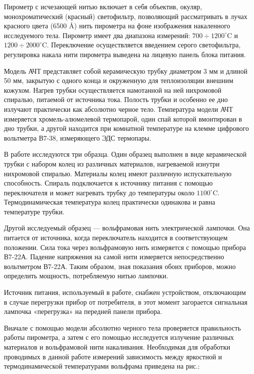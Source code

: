 \documentclass[a4paper,12pt]{article}
\begin{document}
Пирометр с исчезающей нитью включает в себя объектив, окуляр, монохроматический (красный) светофильтр, позволяющий рассматривать в лучах красного цвета (6500 Å) нить пирометра на фоне изображения накаленного исследуемого тела. Пирометр имеет два диапазона измерений: $700 \div 1200^\circ$C и $1200 \div 2000^\circ$C. Переключение осуществляется введением серого светофильтра, регулировка накала нити пирометра выведена на лицевую панель блока питания.

Модель АЧТ представляет собой керамическую трубку диаметром 3 мм и длиной 50 мм, закрытую с одного конца и окруженную для теплоизоляции внешним кожухом. Нагрев трубки осуществляется намотанной на ней нихромовой спиралью, питаемой от источника тока. Полость трубки и особенно ее дно излучают практически как абсолютно черное тело. Температура модели АЧТ измеряется хромель-алюмелевой термопарой, один спай которой вмонтирован в дно трубки, а другой находится при комнатной температуре на клемме цифрового вольтметра В7-38, измеряющего ЭДС термопары.

В работе исследуются три образца. Один образец выполнен в виде керамической трубки с набором колец из различных материалов, нагреваемой изнутри нихромовой спиралью. Материалы колец имеют различную испускательную способность. Спираль подключается к источнику питания с помощью переключателя и может нагревать трубку до температуры около $1100^\circ$C. Термодинамическая температура колец практически одинакова и равна температуре трубки.

Другой исследуемый образец — вольфрамовая нить электрической лампочки. Она питается от источника, когда переключатель находится в соответствующем положении. Сила тока через вольфрамовую нить измеряется с помощью прибора В7-22А. Падение напряжения на самой нити измеряется непосредственно вольтметром В7-22А. Таким образом, зная показания обоих приборов, можно определить мощность, потребляемую нитью лампочки.

Источник питания, используемый в работе, снабжен устройством, отключающим в случае перегрузки прибор от потребителя, в этот момент загорается сигнальная лампочка «перегрузка» на передней панели прибора.

Вначале с помощью модели абсолютно черного тела проверяется правильность работы пирометра, а затем с его помощью исследуется излучение различных материалов и вольфрамовой нити накаливания. Необходимая для обработки проводимых в данной работе измерений зависимость между яркостной и термодинамической температурами вольфрама приведена на рис.:
\end{document}

